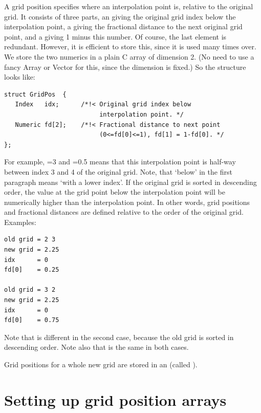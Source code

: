 A grid position specifies where an interpolation point is, relative
to the original grid. It consists of three parts, an  giving the
original grid index below the interpolation point, a 
giving the fractional distance to the next original grid point, and a
 giving 1 minus this number. Of course, the last element is
redundant. However, it is efficient to store this, since it is used
many times over. We store the two numerics in a plain C array of
dimension 2. (No need to use a fancy Array or Vector for this, since
the dimension is fixed.) So the structure  looks like:

\begin{lstlisting}
struct GridPos  {
   Index   idx;      /*!< Original grid index below
                          interpolation point. */
   Numeric fd[2];    /*!< Fractional distance to next point
                          (0<=fd[0]<=1), fd[1] = 1-fd[0]. */ 
};
\end{lstlisting}

For example, =3 and =0.5 means that this interpolation point is
half-way between index 3 and 4 of the original grid.  Note, that
`below' in the first paragraph means `with a lower index'. If the
original grid is sorted in descending order, the value at the grid
point below the interpolation point will be numerically higher than
the interpolation point.  In other words, grid positions and
fractional distances are defined relative to the order of the original
grid. Examples:

\begin{lstlisting}
old grid = 2 3
new grid = 2.25
idx      = 0
fd[0]    = 0.25

old grid = 3 2
new grid = 2.25
idx      = 0
fd[0]    = 0.75
\end{lstlisting}

Note that  is different in the second case, because the old grid
is sorted in descending order. Note also that  is the same in
both cases.

Grid positions for a whole new grid are stored in an 
(called ). 

\section{Setting up grid position arrays}

